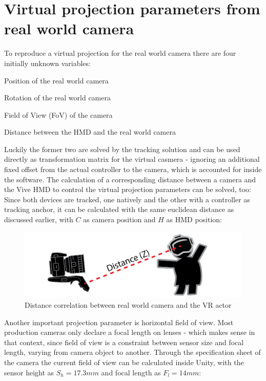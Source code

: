 %
\section{Virtual projection parameters from real world camera}
\label{sec:projection-params}
To reproduce a virtual projection for the real world camera there are four 
initially unknown variables:

\begin{my_list}
	\item Position of the real world camera
	\item Rotation of the real world camera
	\item Field of View (FoV) of the camera
	\item Distance between the HMD and the real world camera
\end{my_list}

Luckily the former two are solved by the tracking solution and can be used 
directly as transformation matrix for the virtual casmera - ignoring an 
additional fixed offset from the actual controller to the camera, which is 
accounted for inside the software.
\newline
The calculation of a corresponding distance between a camera and the Vive HMD 
to control the virtual projection parameters can be solved, too: Since both 
devices are tracked, one natively and the other with a controller as 
tracking anchor, it can be calculated with the same euclidean distance as 
discussed earlier, with $C$ as camera position and $H$ as HMD position:


\begin{figure}[htb]
	\includegraphics[width=\textwidth]{gfx/distance-z.png}
	\caption{Distance correlation between real world camera and the VR actor}
	\label{fig:projection:distance}
\end{figure}

Another important projection parameter is horizontal field of view. Most 
production cameras only declare a focal length on lenses - which makes sense in 
that context, since field of view is a constraint between sensor size and focal 
length, varying from camera object to another. Through the specification sheet 
of the camera the current field of view can be calculated inside Unity, with 
the sensor height as $S_h = 17.3mm$ and focal length as $F_l = 14mm$:

